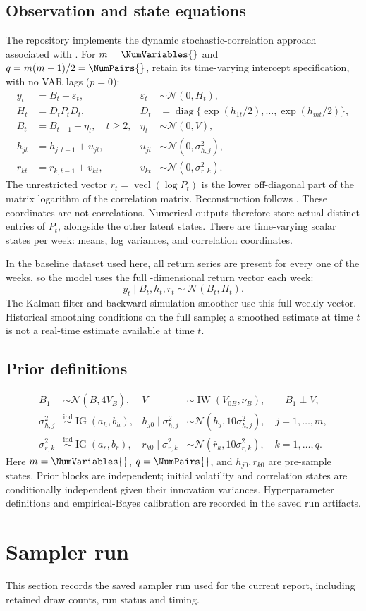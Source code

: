 \documentclass[11pt,a4paper]{article}
\newcommand{\vect}{\operatorname{vecl}}
\newcommand{\diag}{\operatorname{diag}}
\newcommand{\Normal}{\mathcal{N}}
\begin{document}
\subsection{Observation and state equations}
The repository implements the dynamic stochastic-correlation approach associated with \citet{arias2023}. For $m=\NumVariables{}$ and $q=m(m-1)/2=\NumPairs{}$, retain its time-varying intercept specification, with no VAR lags ($p=0$):
\begin{align}
y_t &= B_t+\varepsilon_t,& \varepsilon_t&\sim\Normal(0,H_t),\\
H_t &= D_tP_tD_t,&D_t&=\diag\{\exp(h_{1t}/2),\ldots,\exp(h_{mt}/2)\},\\
B_t&=B_{t-1}+\eta_t,\quad t\geq2,&\eta_t&\sim\Normal(0,V),\\
h_{jt}&=h_{j,t-1}+u_{jt},&u_{jt}&\sim\Normal(0,\sigma_{h,j}^2),\\
r_{kt}&=r_{k,t-1}+v_{kt},&v_{kt}&\sim\Normal(0,\sigma_{r,k}^2).
\end{align}
The unrestricted vector $r_t=\vect(\log P_t)$ is the lower off-diagonal part of the matrix logarithm of the correlation matrix. Reconstruction follows \citet{archakov2021}. These coordinates are not correlations. Numerical outputs therefore store actual distinct entries of $P_t$, alongside the other latent states. There are \NumStates{} time-varying scalar states per week: \NumVariables{} means, \NumVariables{} log variances, and \NumPairs{} correlation coordinates.

In the baseline dataset used here, all \NumVariables{} return series are present for every one of the \NumReturns{} weeks, so the model uses the full \NumVariables{}-dimensional return vector each week:
\begin{equation}
y_t\mid B_t,h_t,r_t\sim\Normal\left(B_t,H_t\right).
\end{equation}
The Kalman filter and backward simulation smoother use this full weekly vector. Historical smoothing conditions on the full sample; a smoothed estimate at time $t$ is not a real-time estimate available at time $t$.
\subsection{Prior definitions}
\begin{align}
B_1 &\sim \Normal(\bar B,4\bar V_B),
& V &\sim \operatorname{IW}(V_{0B},\nu_B),\qquad B_1\perp V,\\
\sigma_{h,j}^2 &\overset{\mathrm{ind}}{\sim}\operatorname{IG}(a_h,b_h),
& h_{j0}\mid\sigma_{h,j}^2 &\sim\Normal(\bar h_j,10\sigma_{h,j}^2),
\quad j=1,\ldots,m,\\
\sigma_{r,k}^2 &\overset{\mathrm{ind}}{\sim}\operatorname{IG}(a_r,b_r),
& r_{k0}\mid\sigma_{r,k}^2 &\sim\Normal(\bar r_k,10\sigma_{r,k}^2),
\quad k=1,\ldots,q.
\end{align}
Here $m=\NumVariables{}$, $q=\NumPairs{}$, and $h_{j0},r_{k0}$ are pre-sample states. Prior blocks are independent; initial volatility and correlation states are conditionally independent given their innovation variances. Hyperparameter definitions and empirical-Bayes calibration are recorded in the saved run artifacts.
\section{Sampler run}
This section records the saved sampler run used for the current report, including retained draw counts, run status and timing.



\end{document}
